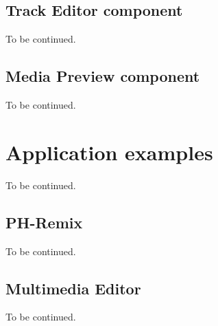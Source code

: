 \subsection{Track Editor component}

To be continued.

\subsection{Media Preview component}

To be continued.

\section{Application examples}

To be continued.

\subsection{PH-Remix}

To be continued.

\subsection{Multimedia Editor}

To be continued.